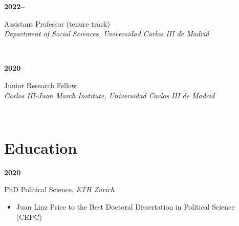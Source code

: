 \documentclass[a4paper, 12pt]{article}
\begin{document}
\begin{minipage}[t]{0.1\textwidth}
\textbf{2022--}
\end{minipage}\hfill\begin{minipage}[t]{0.9\textwidth}
Assistant Professor (tenure track)\\
\textit{Department of Social Sciences, Universidad Carlos III de Madrid}\\\vspace{-8pt}
\end{minipage}\\
\begin{minipage}[t]{0.1\textwidth}
\textbf{2020--}
\end{minipage}\hfill\begin{minipage}[t]{0.9\textwidth}
Junior Research Fellow\\
\textit{Carlos III-Juan March Institute, Universidad Carlos III de Madrid}\\\vspace{-8pt}
\end{minipage}\\

\vspace{-10pt}
\section*{Education}

\begin{minipage}[t]{0.1\textwidth}
  \flushleft
	\textbf{2020}
\end{minipage}
\begin{minipage}[t]{0.9\textwidth}
  PhD Political Science, \textit{ETH Zurich}
	\vspace{-5pt}
	\begin{itemize}\small
	  \item Juan Linz Price to the Best Doctoral Dissertation in Political Science (CEPC)
	\end{itemize}
\end{minipage}
\end{document}
